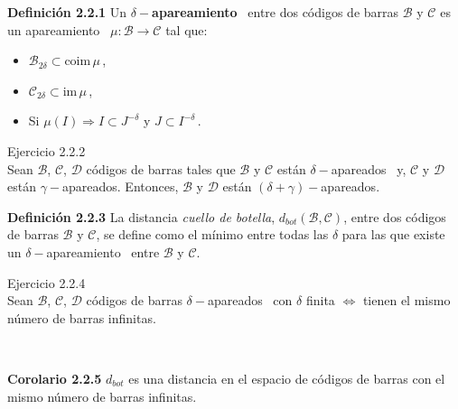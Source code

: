 \documentclass{beamer}
\newcounter{Ejercicio}
\def\matching{apareamiento}
\def\matched{apareados}
\begin{document}
\begin{frame}
\begin{block}{\textbf{Definici\'on 2.2.1}}
Un $\delta-${\bfseries \matching}~ entre dos c\'odigos de barras $\mathcal{B}$ y $\mathcal{C}$ es un \matching~ $\mu:\mathcal{B}\rightarrow\mathcal{C}$ tal que:
\begin{itemize}
\item $\mathcal{B}_{2\delta}\subset \mbox{coim}\,\mu\,$,
\item $\mathcal{C}_{2\delta}\subset \mbox{im}\,\mu\,$,
\item Si $\mu\left(I\right)\Rightarrow I\subset J^{-\delta}$ y $J\subset I^{-\delta}\,$.
\end{itemize}
\end{block}
\vspace{1em}
\centering
\begin{minipage}{0.7\textwidth}
Ejercicio 2.2.2\\
Sean $\mathcal{B}$, $\mathcal{C}$, $\mathcal{D}$ c\'odigos de barras tales que $\mathcal{B}$ y $\mathcal{C}$ est\'an $\delta-$\matched~ y, $\mathcal{C}$ y $\mathcal{D}$ est\'an $\gamma-$\matched. Entonces, $\mathcal{B}$ y $\mathcal{D}$ est\'an $(\delta+\gamma)-$\matched.
\end{minipage}
\end{frame}



\begin{frame}
\begin{block}{\textbf{Definici\'on 2.2.3}}
La distancia \emph{cuello de botella}, $d_{bot}\left( \mathcal{B},\mathcal{C}\right)$, entre dos c\'odigos de barras $\mathcal{B}$ y $\mathcal{C}$, se define como el m\'inimo entre todas las $\delta$ para las que existe un $\delta-$\matching~ entre $\mathcal{B}$ y $\mathcal{C}$.
\end{block}
\end{frame}


\begin{frame}
\centering
\begin{minipage}{0.7\textwidth}
Ejercicio 2.2.4\\
Sean $\mathcal{B}$, $\mathcal{C}$, $\mathcal{D}$ c\'odigos de barras $\delta-$\matched~ con $\delta$ finita $\Leftrightarrow$ tienen el mismo n\'umero de barras infinitas.
\end{minipage}\\

\vspace{2em}
\begin{block}{\textbf{Corolario 2.2.5}}
$d_{bot}$ es una distancia en el espacio de c\'odigos de barras con el mismo n\'umero de barras infinitas.
\end{block}
\end{frame}
\end{document}
